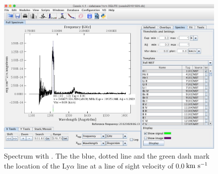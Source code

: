 \documentclass [a4paper, 12pt]{article}
\begin{document}
\begin{itemize}
\begin{figure}[H]
\center
\includegraphics[width=0.6  \textwidth]{../images/cassis_display_spectrum-2.jpg}
\caption{Spectrum with \cassis. The the blue, dotted line and the green dash
mark the location of the Ly$\alpha$ line at a line of sight velocity of
0.0\,$\rm km\ s^{-1}$}
\label{fig:spectrum2}
\end{figure}


\end{itemize}
\end{document}
